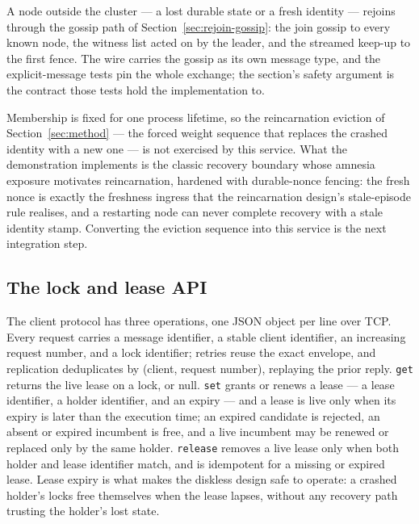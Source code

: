 \documentclass[10pt,journal,letterpaper]{IEEEtran}
\newcommand{\code}[1]{\texttt{#1}}
\begin{document}
A node outside the cluster --- a lost durable state or a fresh identity ---
rejoins through the gossip path of
Section~\ref{sec:rejoin-gossip}: the join gossip to every known node, the
witness list acted on by the leader, and the streamed keep-up to the first
fence. The wire carries the gossip as its own message type, and the
explicit-message tests pin the whole exchange; the section's safety
argument is the contract those tests hold the implementation to.

Membership is fixed for one process lifetime, so the reincarnation eviction
of Section~\ref{sec:method} --- the forced weight sequence that
replaces the crashed identity with a new one --- is not exercised by this
service. What the demonstration implements is the classic recovery boundary
whose amnesia exposure motivates reincarnation, hardened with durable-nonce
fencing: the fresh nonce is exactly the freshness ingress that the
reincarnation design's stale-episode rule realises, and a restarting node can
never complete recovery with a stale identity stamp. Converting the eviction
sequence into this service is the next integration step.

\subsection{The lock and lease API}
The client protocol has three operations, one JSON object per line over TCP.
Every request carries a message identifier, a stable client identifier, an
increasing request number, and a lock identifier; retries reuse the exact
envelope, and replication deduplicates by (client, request number), replaying
the prior reply.
\code{get} returns the live lease on a lock, or null.
\code{set} grants or renews a lease --- a lease identifier, a holder
identifier, and an expiry --- and a lease is live only when its expiry is
later than the execution time; an expired candidate is rejected, an absent or
expired incumbent is free, and a live incumbent may be renewed or replaced
only by the same holder.
\code{release} removes a live lease only when both holder and lease
identifier match, and is idempotent for a missing or expired lease. Lease
expiry is what makes the diskless design safe to operate: a crashed holder's
locks free themselves when the lease lapses, without any recovery path
trusting the holder's lost state.
\end{document}

